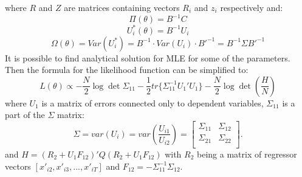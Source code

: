 \documentclass[a4paper]{article}
\begin{document}
where $R$ and $Z$ are matrices containing vectors $R_i$ and $z_i$ respectively and:
\begin{equation}\label{eq14}
    \Pi(\theta) = B^{-1} C
\end{equation}
\begin{equation}\label{eq15}
    U^*_i(\theta) = B^{-1} U_i
\end{equation}
\begin{equation}\label{eq16}
    \Omega(\theta) = Var(U^*_i) = B^{-1} \cdot Var(U_i) \cdot  B'^{-1} = B^{-1} \Sigma B'^{-1}
\end{equation}
It is possible to find analytical solution for MLE for some of the parameters.
Then the formula for the likelihood function can be simplified to:
\begin{equation}\label{eq17}
    L(\theta) \propto - \frac{N}{2} \log \det \Sigma_{11} - \frac{1}{2} tr \{ \Sigma_{11}^{-1} U_1' U_1 \} - \frac{N}{2} \log \det (\frac{H}{N})
\end{equation}
\normalsize
\noindent where $U_1$ is a matrix of errors connected only to dependent variables, $\Sigma_{11}$ is a part of the $\Sigma$ matrix:
\begin{equation}\label{eq18}
\Sigma=var(U_{i})=var\left(\frac{U_{i1}}{U_{i2}}\right)=\begin{bmatrix}
            \Sigma_{11}&\Sigma_{12}\\
            \Sigma_{21}&\Sigma_{22}\\
            \end{bmatrix}.
\end{equation}
\noindent and $H = (R_2 + U_1 F_{12})' Q (R_2 + U_1 F_{12})$ with $R_2$ being a matrix of regressor vectors $[x'_{i2}, x'_{i3}, ..., x'_{iT}]$ and $F_{12} = - \Sigma_{11}^{-1} \Sigma_{12}$.
\end{document}

